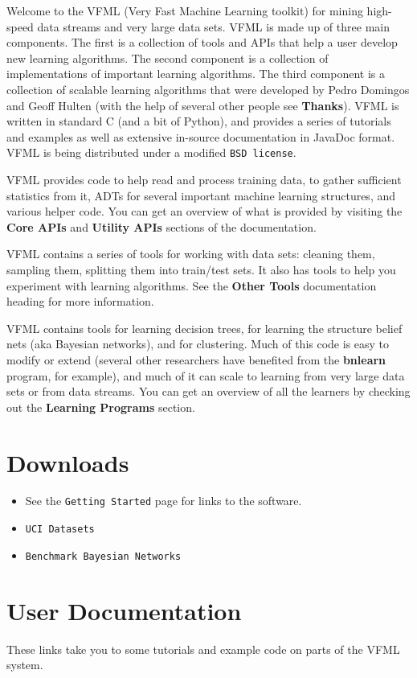 Welcome to the VFML (Very Fast Machine Learning toolkit) for mining high-speed data streams and very large data sets. VFML is made up of three main components. The first is a collection of tools and APIs that help a user develop new learning algorithms. The second component is a collection of implementations of important learning algorithms. The third component is a collection of scalable learning algorithms that were developed by Pedro Domingos and Geoff Hulten (with the help of several other people see {\bf Thanks}). VFML is written in standard C (and a bit of Python), and provides a series of tutorials and examples as well as extensive in-source documentation in Java\-Doc format. VFML is being distributed under a modified {\tt BSD license}.

VFML provides code to help read and process training data, to gather sufficient statistics from it, ADTs for several important machine learning structures, and various helper code. You can get an overview of what is provided by visiting the {\bf Core APIs} and {\bf Utility APIs} sections of the documentation.

VFML contains a series of tools for working with data sets: cleaning them, sampling them, splitting them into train/test sets. It also has tools to help you experiment with learning algorithms. See the {\bf Other Tools} documentation heading for more information.

VFML contains tools for learning decision trees, for learning the structure belief nets (aka Bayesian networks), and for clustering. Much of this code is easy to modify or extend (several other researchers have benefited from the {\bf bnlearn} program, for example), and much of it can scale to learning from very large data sets or from data streams. You can get an overview of all the learners by checking out the {\bf Learning Programs} section.\section{Downloads}\label{downloads}
\begin{itemize}
\item See the {\tt Getting Started} page for links to the software.\item {\tt UCI Datasets}\item {\tt Benchmark Bayesian Networks}\end{itemize}
\section{User Documentation}\label{topics}
These links take you to some tutorials and example code on parts of the VFML system.

